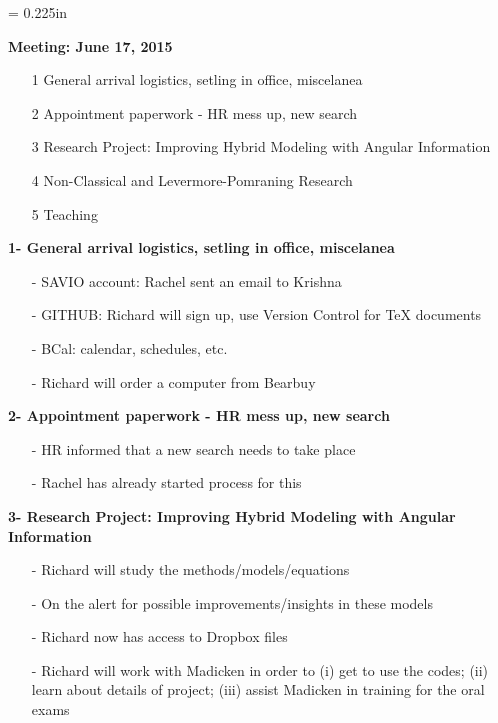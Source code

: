 \documentclass[12pt]{article}
\begin{document}
\baselineskip= 0.225in
\parindent=0.35in


\vspace*{0.2in}
\begin{center} 
{\bf \Large Meeting: June 17, 2015 \\ 
}
\end{center}

\begin{large}
\begin{itemize}
\item[1] General arrival logistics, setling in office, miscelanea
\item[2] Appointment paperwork - HR mess up, new search
\item[3] Research Project: Improving Hybrid Modeling with Angular Information
\item[4] Non-Classical and Levermore-Pomraning Research
\item[5] Teaching 
\end{itemize}
\end{large}

\noindent\textbf{1- General arrival logistics, setling in office, miscelanea}
\begin{itemize}
\item[-] SAVIO account: Rachel sent an email to Krishna
\item[-] GITHUB: Richard will sign up, use Version Control for TeX documents
\item[-] BCal: calendar, schedules, etc.
\item[-] Richard will order a computer from Bearbuy
\end{itemize}

\noindent\textbf{2- Appointment paperwork - HR mess up, new search}
\begin{itemize}
\item[-] HR informed that a new search needs to take place
\item[-] Rachel has already started process for this
\end{itemize}

\noindent\textbf{3- Research Project: Improving Hybrid Modeling with Angular Information}
\begin{itemize}
\item[-] Richard will study the methods/models/equations
\item[-] On the alert for possible improvements/insights in these models
\item[-] Richard now has access to Dropbox files
\item[-] Richard will work with Madicken in order to (i) get to use the codes; (ii) learn about details of project; (iii) assist Madicken in training for the oral exams
\end{itemize}
\end{document}
